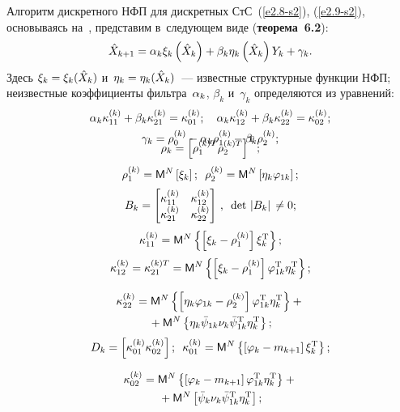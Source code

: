 \begin{multicols}{2}
Алгоритм дискретного НФП для дискретных СтС~(\ref{e2.8-s2}), (\ref{e2.9-s2}), 
основываясь на~\cite{3-s2}, представим в~следующем виде (\textbf{теорема~6.2}):
    \begin{equation*}
    \hat X_{k+1} = \alpha_k \xi_k \left(\hat X_k\right) + 
    \beta_k\eta_k\left(\hat X_k\right) Y_k +\gamma_k.
    \end{equation*}
Здесь $\xi_k =\xi_k(\hat X_k)$ и~$\eta_k=\eta_k (\hat X_k)$~--- известные
структурные функции НФП; неизвестные коэффициенты фильтра~$\alpha_k$, 
$\beta_k$ и~$\gamma_k$ определяются из уравнений:
\begin{gather*}
 \alpha_k \kappa_{11}^{(k)} +\beta_k \kappa_{21}^{(k)} =\kappa_{01}^{(k)};\quad 
 \alpha_k \kappa_{12}^{(k)} +
 \beta_k \kappa_{22}^{(k)} = \kappa_{02}^{(k)};
\\ 
 \gamma_k =\rho_0^{(k)} - \alpha_k \rho_1^{(k)} - \beta_k \rho_2^{(k)};\\[-20pt]
\end{gather*}

\noindent
 $$ 
 \rho_k=\left[ \rho_1^{(k)T}\rho_2^{(k)T}\right]^{\mathrm{T}};$$
 $$
 \rho_1^{(k)} = {\sf M}^N \left[ \xi_k\right] ;\enskip 
 \rho_2^{(k)}={\sf M}^N\left[ \eta_k  \varphi_{1k}\right];
 $$
 $$
 B_k=\begin{bmatrix}
 \kappa_{11}^{(k)}&\kappa_{12}^{(k)}\\
 \kappa_{21}^{(k)}&\kappa_{22}^{(k)}\end{bmatrix}\,,
 \enskip \det \,\left\vert B_k\right\vert\, \ne 0;
 $$
 $$
 \kappa_{11}^{(k)} ={\sf M}^N \left\{\left[ \xi_k  -\rho_1^{(k)}\right] 
 \xi_k^{\mathrm{T}}\right\};
 $$
 $$
 \kappa_{12}^{(k)} =\kappa_{21}^{(k)T}={\sf M}^N \left\{\left[ \xi_k  -\rho_1^{(k)}\right] \varphi_{1k}^{\mathrm{T}} \eta_k^{\mathrm{T}} \right\};
 $$
 
 \vspace*{-12pt}

\noindent
\begin{multline*}
 \kappa_{22}^{(k)} = {\sf M}^N \left\{\left[ \eta_k  \varphi_{1k}  -\rho_2^{(k)} \right] 
 \varphi_{1k}^{\mathrm{T}} \eta_k^{\mathrm{T}} \right\}+{}\\
 {}+
 {\sf M}^N \left\{ \eta_k \bar\psi_{1k} \nu_k \bar\psi_{1k}^{\mathrm{T}} \eta_k^{\mathrm{T}}\right\};
\end{multline*}
 $$
  D_k =\left[ \kappa_{01}^{(k)} \kappa_{02}^{(k)}\right];\enskip  
  \kappa_{01}^{(k)} ={\sf M}^N \left\{\left[ \varphi_k - m_{k+1}\right] \xi_k^{\mathrm{T}}\right\};
  $$
  
  \vspace*{-12pt}

\noindent
\begin{multline*}
 \kappa_{02}^{(k)} = {\sf M}^N \left\{\left[ \varphi_{k}  - 
 m_{k+1}\right] \varphi_{1k}^{\mathrm{T}} \eta_k^{\mathrm{T}}\right\}+{}\\
 {}+{\sf M}^N\left[ 
 \bar\psi_k  \nu_k \bar\psi_{1k}^{\mathrm{T}} \eta_k^{\mathrm{T}}\right];
\end{multline*}


\end{multicols}
